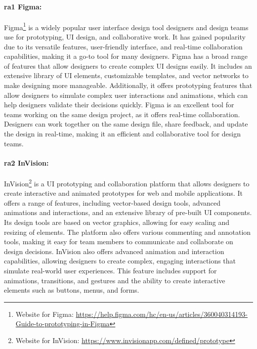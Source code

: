 \paragraph{\ac{ra}1 Figma:} 
Figma\footnote{Website for Figma: \url{https://help.figma.com/hc/en-us/articles/360040314193-Guide-to-prototyping-in-Figma}} is a widely popular user interface design tool designers and design teams use for prototyping, UI design, and collaborative work. 
It has gained popularity due to its versatile features, user-friendly interface, and real-time collaboration capabilities, making it a go-to tool for many designers.
Figma has a broad range of features that allow designers to create complex UI designs easily. 
It includes an extensive library of UI elements, customizable templates, and vector networks to make designing more manageable. 
Additionally, it offers prototyping features that allow designers to simulate complex user interactions and animations, which can help designers validate their decisions quickly. 
Figma is an excellent tool for teams working on the same design project, as it offers real-time collaboration. 
Designers can work together on the same design file, share feedback, and update the design in real-time, making it an efficient and collaborative tool for design teams.

\paragraph{\ac{ra}2 InVision:}
InVision\footnote{Website for InVision: \url{https://www.invisionapp.com/defined/prototype}} is a UI prototyping and collaboration platform that allows designers to create interactive and animated prototypes for web and mobile applications. 
It offers a range of features, including vector-based design tools, advanced animations and interactions, and an extensive library of pre-built UI components.
Its design tools are based on vector graphics, allowing for easy scaling and resizing of elements.
The platform also offers various commenting and annotation tools, making it easy for team members to communicate and collaborate on design decisions.
InVision also offers advanced animation and interaction capabilities, allowing designers to create complex, engaging interactions that simulate real-world user experiences. This feature includes support for animations, transitions, and gestures and the ability to create interactive elements such as buttons, menus, and forms.

